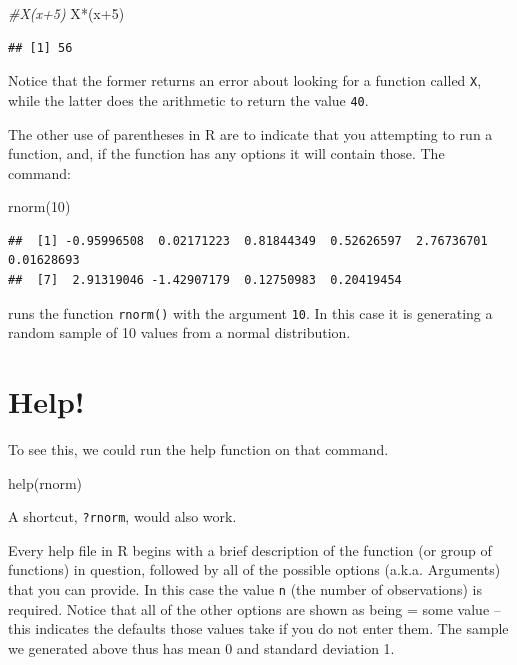 \documentclass[
]{book}
\newenvironment{Shaded}{\begin{snugshade}}{\end{snugshade}}
\newcommand{\CommentTok}[1]{\textcolor[rgb]{0.56,0.35,0.01}{\textit{#1}}}
\newcommand{\DecValTok}[1]{\textcolor[rgb]{0.00,0.00,0.81}{#1}}
\newcommand{\FunctionTok}[1]{\textcolor[rgb]{0.00,0.00,0.00}{#1}}
\newcommand{\NormalTok}[1]{#1}
\newcommand{\SpecialCharTok}[1]{\textcolor[rgb]{0.00,0.00,0.00}{#1}}
\begin{document}
\begin{Shaded}
\begin{Highlighting}[]
\CommentTok{\#X(x+5)}
\NormalTok{X}\SpecialCharTok{*}\NormalTok{(x}\SpecialCharTok{+}\DecValTok{5}\NormalTok{)}
\end{Highlighting}
\end{Shaded}

\begin{verbatim}
## [1] 56
\end{verbatim}

Notice that the former returns an error about looking for a function called \texttt{X}, while the latter does the arithmetic to return the value \texttt{40}.

The other use of parentheses in R are to indicate that you attempting to run a function, and, if the function has any options it will contain those. The command:

\begin{Shaded}
\begin{Highlighting}[]
\FunctionTok{rnorm}\NormalTok{(}\DecValTok{10}\NormalTok{)}
\end{Highlighting}
\end{Shaded}

\begin{verbatim}
##  [1] -0.95996508  0.02171223  0.81844349  0.52626597  2.76736701  0.01628693
##  [7]  2.91319046 -1.42907179  0.12750983  0.20419454
\end{verbatim}

runs the function \texttt{rnorm()} with the argument \texttt{10}. In this case it is generating a random sample of 10 values from a normal distribution.

\hypertarget{help}{%
\section{Help!}\label{help}}

To see this, we could run the help function on that command.

\begin{Shaded}
\begin{Highlighting}[]
\FunctionTok{help}\NormalTok{(rnorm)}
\end{Highlighting}
\end{Shaded}

A shortcut, \texttt{?rnorm}, would also work.

Every help file in R begins with a brief description of the function (or group of functions) in question, followed by all of the possible options (a.k.a. Arguments) that you can provide. In this case the value \texttt{n} (the number of observations) is required. Notice that all of the other options are shown as being = some value -- this indicates the defaults those values take if you do not enter them. The sample we generated above thus has mean 0 and standard deviation 1.
\end{document}
